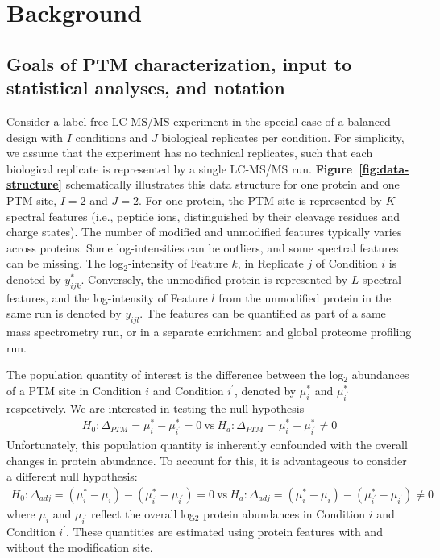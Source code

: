\documentclass[mcp]{article}
\numberwithin{table}{section}
\def\figref#1{{\bf Figure~\ref{fig:#1}}}
\begin{document}
\section*{Background}

\subsection*{Goals of PTM characterization, input to statistical analyses, and notation}

Consider a label-free LC-MS/MS experiment in the special case of a balanced design with $I$ conditions and $J$ biological replicates per condition. For simplicity, we assume that the experiment has no technical replicates, such that each biological replicate is represented by a single LC-MS/MS run.  
\figref{data-structure} schematically illustrates this data structure for one protein and one PTM site, $I=2$ and $J=2$.
For one protein, the PTM site is represented by $K$ spectral features (i.e., peptide ions, distinguished by their cleavage residues and charge states). 
The number of modified and unmodified features typically varies across proteins. Some log-intensities can be outliers, and some spectral features can be missing. 
The log$_2$-intensity of Feature $k$, in Replicate $j$ of Condition $i$ is denoted by $y_{ijk}^{\ast}$. Conversely, the unmodified protein is represented by $L$ spectral features, and the log-intensity of Feature $l$ from the unmodified protein in the same run is denoted by $y_{ijl}$. The features can be quantified as part of a same mass spectrometry run, or in a separate enrichment and global proteome profiling run.

The population quantity of interest is the difference between the log$_2$ abundances of a PTM site in Condition $i$ and Condition $i^{\prime}$, denoted by $\mu_i^{\ast}$ and $\mu_{i^{\prime}}^{\ast}$ respectively. We are interested in testing the null hypothesis
\begin{eqnarray}
H_{0}: \Delta_{PTM} = \mu_{i}^{\ast} - \mu_{i^{\prime}}^{\ast} = 0 \ \text{vs} \ 
H_{a}: \Delta_{PTM} = \mu_{i}^{\ast} - \mu_{i^{\prime}}^{\ast} \neq 0
\label{eq:conv_null_hyp}
\end{eqnarray}
Unfortunately, this population quantity is inherently confounded with the overall changes in protein abundance. To account for this, it is advantageous to consider a different null hypothesis:
\begin{eqnarray}
H_{0}: \Delta_{adj} = ( \mu_{i}^{\ast} - \mu_{i}) - ( \mu_{i^{\prime}}^{\ast} - \mu_{i^{\prime}} ) = 0 \ \text{vs} \ 
H_{a}: \Delta_{adj} = ( \mu_{i}^{\ast} - \mu_{i}) - ( \mu_{i^{\prime}}^{\ast} - \mu_{i^{\prime}} ) \neq 0
\label{eq:null_hyp}
\end{eqnarray}
where $\mu_i$ and $\mu_{i^{\prime}}$ reflect the overall log$_2$ protein abundances in Condition $i$ and Condition $i^{\prime}$. These quantities are estimated using protein features with and without the modification site.
\end{document}
